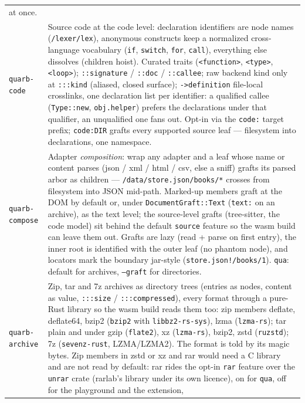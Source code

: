 \documentclass{report}
\begin{document}
\begin{xltabular}{\textwidth}{l X}
  at once. \\
\texttt{quarb-code} & Source code at the code level:
  declaration identifiers are node names
  (\texttt{/lexer/lex}), anonymous constructs keep a
  normalized cross-language vocabulary (\texttt{if},
  \texttt{switch}, \texttt{for}, \texttt{call}), everything
  else dissolves (children hoist). Curated traits
  (\texttt{<function>}, \texttt{<type>}, \texttt{<loop>});
  \texttt{::signature} / \texttt{::doc} / \texttt{::callee};
  raw backend kind only at \texttt{:::kind} (aliased, closed
  surface); \texttt{->definition} file-local crosslinks, one
  declaration list per identifier: a qualified callee
  (\texttt{Type::new}, \texttt{obj.helper}) prefers the
  declarations under that qualifier, an unqualified one fans out.
  Opt-in via the \texttt{code:} target prefix;
  \texttt{code:DIR} grafts every supported source leaf —
  filesystem into declarations, one namespace. \\
\texttt{quarb-compose} & Adapter \emph{composition}: wrap any
  adapter and a leaf whose name or content parses (json / xml /
  html / csv, else a sniff) grafts its parsed arbor as children —
  \texttt{/data/store.json/books/*} crosses from filesystem into
  JSON mid-path. Marked-up members graft at the DOM by default or,
  under \texttt{DocumentGraft::Text} (\texttt{text:} on an
  archive), as the text level; the source-level grafts
  (tree-sitter, the code model) sit behind the default
  \texttt{source} feature so the wasm build can leave them out.
  Grafts are lazy (read + parse on first entry),
  the inner root is identified with the outer leaf (no phantom
  node), and locators mark the boundary jar-style
  (\texttt{store.json!/books/1}). \texttt{qua}: default for
  archives, \texttt{--graft} for directories. \\
\texttt{quarb-archive} & Zip, tar and 7z archives as directory trees
  (entries as nodes, content as value, \texttt{:::size} /
  \texttt{:::compressed}), every format through a pure-Rust
  library so the wasm build reads them too: zip members deflate,
  deflate64, bzip2 (\texttt{bzip2} with \texttt{libbz2-rs-sys}),
  lzma (\texttt{lzma-rs}); tar plain and under gzip
  (\texttt{flate2}), xz (\texttt{lzma-rs}), bzip2, zstd
  (\texttt{ruzstd}); 7z (\texttt{sevenz-rust}, LZMA/LZMA2). The
  format is told by its magic bytes. Zip members in zstd or xz and
  rar would need a C library and are not read by default:
  rar rides the opt-in \texttt{rar} feature over the
  \texttt{unrar} crate (rarlab's library under its own licence),
  on for \texttt{qua}, off for the playground and the extension,

\end{xltabular}
\end{document}
